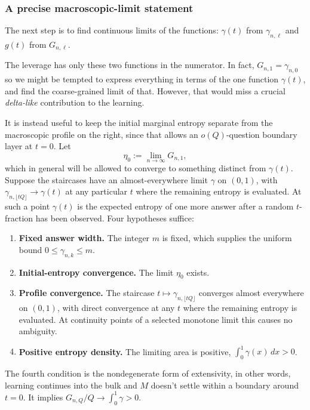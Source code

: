 \documentclass[11pt]{article}
\begin{document}
\subsubsection{A precise macroscopic-limit statement}

The next step is to find continuous limits of the functions: $\gamma(t)$ from $\gamma_{n,\ell}$ and $g(t)$ from $G_{n,\ell}$.

The leverage has only these two functions in the numerator. In fact, $G_{n,1}=\gamma_{n,0}$ so we might be
tempted to express everything in terms of the one function $\gamma(t)$, and find the coarse-grained limit
of that. However, that would miss a crucial \emph{delta-like} contribution to the learning.

It is instead useful to keep the initial marginal entropy separate from the
macroscopic profile on the right, since that allows an
$o(Q)$-question boundary layer at $t = 0$. Let
%
\begin{equation}
  \eta_0 := \lim_{n\to\infty} G_{n,1}, 
\end{equation}
which in general will be allowed to converge to something distinct from $\gamma(t)$.
Suppose the staircases have an
almost-everywhere limit $\gamma$ on $(0,1)$, with
$\gamma_{n,\lfloor tQ\rfloor} \to \gamma(t)$ at any particular $t$
where the remaining entropy is evaluated. At such a point $\gamma(t)$
is the expected entropy of one more answer after a random
$t$-fraction has been observed. Four hypotheses suffice:
%
\begin{enumerate}
  \item \textbf{Fixed answer width.} The integer $m$ is fixed, which
    supplies the uniform bound $0 \le \gamma_{n,k} \le m$.
  \item \textbf{Initial-entropy convergence.} The limit $\eta_0$ exists.
  \item \textbf{Profile convergence.} The staircase
    $t \mapsto \gamma_{n,\lfloor tQ\rfloor}$ converges almost
    everywhere on $(0,1)$, with direct convergence at any $t$ where
    the remaining entropy is evaluated. At continuity points of a
    selected monotone limit this causes no ambiguity.
  \item \textbf{Positive entropy density.} The limiting area is
    positive, $\int_0^1\gamma(x)\,dx > 0$.
\end{enumerate}
%
The fourth condition is the nondegenerate form of extensivity, in other words,
learning continues into the bulk and $M$ doesn't settle within a boundary around $t=0$. 
It implies $G_{n,Q}/Q \to \int_0^1\gamma > 0$. 
\end{document}
